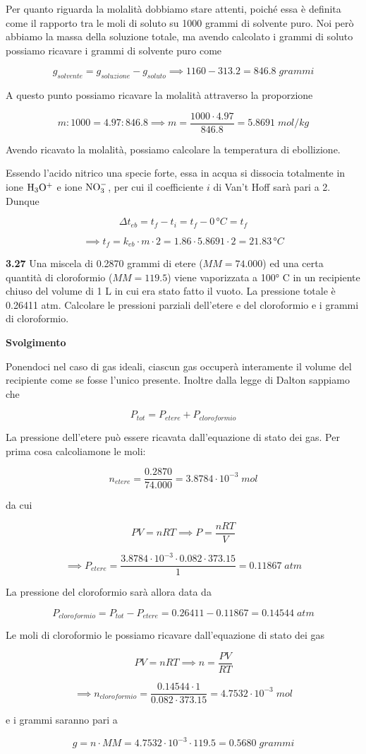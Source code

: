 \vspace{0.2cm}Per quanto riguarda la molalità dobbiamo stare attenti, poiché essa è definita come il rapporto tra le moli di soluto su 1000 grammi di solvente puro. Noi però abbiamo la massa della soluzione totale, ma avendo calcolato i grammi di soluto possiamo ricavare i grammi di solvente puro come

$$g_{solvente}=g_{soluzione} - g_{soluto}
\implies
1160 -313.2=846.8\;grammi$$

A questo punto possiamo ricavare la molalità attraverso la proporzione

$$m:1000=4.97:846.8
\implies
m=\frac{1000 \cdot 4.97}{846.8}=5.8691\;mol/kg$$

Avendo ricavato la molalità, possiamo calcolare la temperatura di ebollizione.

Essendo l'acido nitrico una specie forte, essa in acqua si dissocia totalmente in ione $\rm H_3O^+$ e ione $\rm NO_3^-$, per cui il coefficiente $i$ di Van't Hoff sarà pari a 2. Dunque

$$\Delta t_{eb}=t_f - t_i=t_f - 0\,\text{°}C=t_f$$

$$\implies t_f=k_{eb} \cdot m \cdot 2
=1.86 \cdot 5.8691 \cdot 2=21.83\,\text{°}C$$

\vspace{0.2cm}\textbf{3.27} Una miscela di 0.2870 grammi di etere ($MM=74.000$) ed una certa quantità di cloroformio ($MM=119.5$) viene vaporizzata a 100° C in un recipiente chiuso del volume di 1 L in cui era stato fatto il vuoto. La pressione totale è 0.26411 atm. Calcolare le pressioni parziali dell'etere e del cloroformio e i grammi di cloroformio.

\vspace{0.2cm}\large\textbf{Svolgimento}\normalsize

\vspace{0.2cm}Ponendoci nel caso di gas ideali, ciascun gas occuperà interamente il volume del recipiente come se fosse l'unico presente. Inoltre dalla legge di Dalton sappiamo che

$$P_{tot}=P_{etere} + P_{cloroformio}$$

La pressione dell'etere può essere ricavata dall'equazione di stato dei gas. Per prima cosa calcoliamone le moli:

$$n_{etere}=\frac{0.2870}{74.000}=3.8784 \cdot 10^{-3}\;mol$$

da cui 

$$PV=nRT 
\implies
P=\frac{nRT}{V}$$

$$\implies P_{etere}
=\frac{3.8784 \cdot 10^{-3} \cdot 0.082 \cdot 373.15}{1}
=0.11867\;atm$$

La pressione del cloroformio sarà allora data da

$$P_{cloroformio}=P_{tot}-P_{etere}
=0.26411-0.11867=0.14544\;atm$$

Le moli di cloroformio le possiamo ricavare dall'equazione di stato dei gas

$$PV=nRT
\implies
n=\frac{PV}{RT}$$

$$\implies
n_{cloroformio}=\frac{0.14544 \cdot 1}{0.082 \cdot 373.15}
=4.7532 \cdot 10^{-3}\;mol$$

e i grammi saranno pari a

$$g=n \cdot MM=4.7532 \cdot 10^{-3} \cdot 119.5=0.5680\;grammi$$
